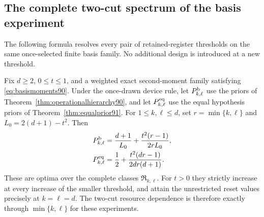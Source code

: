 \subsection{The complete two-cut spectrum of the basis experiment}
The following formula resolves every pair of retained-register
thresholds on the same once-selected finite basis family.  No
additional design is introduced at a new threshold.
\begin{theorem}\label{thm:rankspectrum92}
Fix $d\ge2$, $0\le t\le1$, and a weighted exact second-moment family
satisfying \eqref{eq:basismoments90}.  Under the once-drawn device rule,
let $P_{k,\ell}^{\rm b}$ use the priors of
Theorem~\ref{thm:operationalhierarchy90}, and let
$P_{k,\ell}^{\rm eq}$ use the equal hypothesis priors of
Theorem~\ref{thm:equalprior91}.  For $1\le k,\ell\le d$, set
$r=\min\{k,\ell\}$ and $L_0=2(d+1)-t^2$.  Then
\begin{align}
 P_{k,\ell}^{\rm b}
 &=\frac{d+1}{L_0}+\frac{t^2(r-1)}{2rL_0},
 \label{eq:rankbiased92}\\
 P_{k,\ell}^{\rm eq}
 &=\frac12+\frac{t^2(dr-1)}{2dr(d+1)}.
 \label{eq:rankequal92}
\end{align}
These are optima over the complete classes
$\mathfrak R_{k,\ell}$.  For $t>0$ they strictly increase at every
increase of the smaller threshold, and attain the unrestricted reset
values precisely at $k=\ell=d$.  The two-cut resource dependence is
therefore exactly through $\min\{k,\ell\}$ for these experiments.
\end{theorem}
